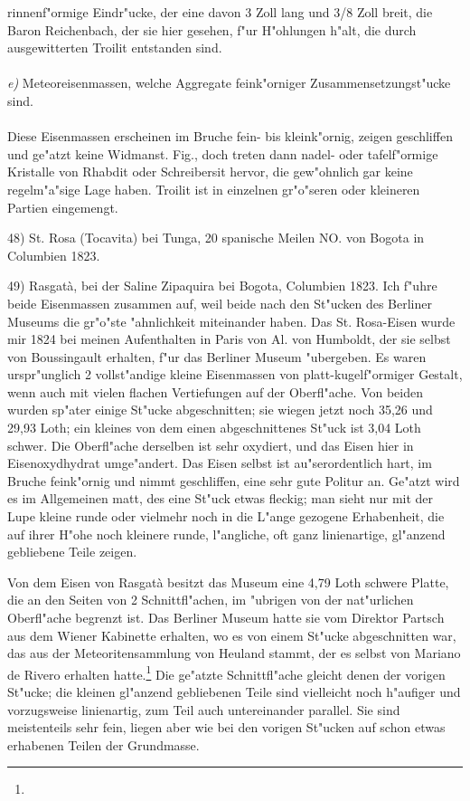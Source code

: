 \documentclass[a4paper, 11pt, oneside]{article}
\begin{document}
rinnenf"ormige Eindr"ucke, der eine davon 3 Zoll lang und 3/8 Zoll breit, die Baron Reichenbach, der sie hier gesehen, f"ur H"ohlungen h"alt, die durch ausgewitterten Troilit entstanden sind.
\vspace{\medskipamount}
\paragraph{}
\emph{e)} Meteoreisenmassen, welche Aggregate feink"orniger Zusammensetzungst"ucke sind.
\vspace{\medskipamount}
\paragraph{}
Diese Eisenmassen erscheinen im Bruche fein- bis kleink"ornig, zeigen geschliffen und ge"atzt keine Widmanst. Fig., doch treten dann nadel- oder tafelf"ormige Kristalle von Rhabdit oder Schreibersit hervor, die gew"ohnlich gar keine regelm"a"sige Lage haben. Troilit ist in einzelnen gr"o"seren oder kleineren Partien eingemengt.

48) St. Rosa (Tocavita) bei Tunga, 20 spanische Meilen NO. von Bogota in Columbien 1823.

49) Rasgatà, bei der Saline Zipaquira bei Bogota, Columbien 1823. Ich f"uhre beide Eisenmassen zusammen auf, weil beide nach den St"ucken des Berliner Museums die gr"o"ste "ahnlichkeit miteinander haben. Das St. Rosa-Eisen wurde mir 1824 bei meinen Aufenthalten in Paris von Al. von Humboldt, der sie selbst von Boussingault erhalten, f"ur das Berliner Museum "ubergeben. Es waren urspr"unglich 2 vollst"andige kleine Eisenmassen von platt-kugelf"ormiger Gestalt, wenn auch mit vielen flachen Vertiefungen auf der Oberfl"ache. Von beiden wurden sp"ater einige St"ucke abgeschnitten; sie wiegen jetzt noch 35,26 und 29,93 Loth; ein kleines von dem einen abgeschnittenes St"uck ist 3,04 Loth schwer. Die Oberfl"ache derselben ist sehr oxydiert, und das Eisen hier in Eisenoxydhydrat umge"andert. Das Eisen selbst ist au"serordentlich hart, im Bruche feink"ornig und nimmt geschliffen, eine sehr gute Politur an. Ge"atzt wird es im Allgemeinen matt, des eine St"uck etwas fleckig; man sieht nur mit der Lupe kleine runde oder vielmehr noch in die L"ange gezogene Erhabenheit, die auf ihrer H"ohe noch kleinere runde, l"angliche, oft ganz linienartige, gl"anzend gebliebene Teile zeigen.

Von dem Eisen von Rasgatà besitzt das Museum eine 4,79 Loth schwere Platte, die an den Seiten von 2 Schnittfl"achen, im "ubrigen von der nat"urlichen Oberfl"ache begrenzt ist. Das Berliner Museum hatte sie vom Direktor Partsch aus dem Wiener Kabinette erhalten, wo es von einem St"ucke abgeschnitten war, das aus der Meteoritensammlung von Heuland stammt, der es selbst von Mariano de Rivero erhalten hatte.\footnote{} Die ge"atzte Schnittfl"ache gleicht denen der vorigen St"ucke; die kleinen gl"anzend gebliebenen Teile sind vielleicht noch h"aufiger und vorzugsweise linienartig, zum Teil auch untereinander parallel. Sie sind meistenteils sehr fein, liegen aber wie bei den vorigen St"ucken auf schon etwas erhabenen Teilen der Grundmasse.
\end{document}
